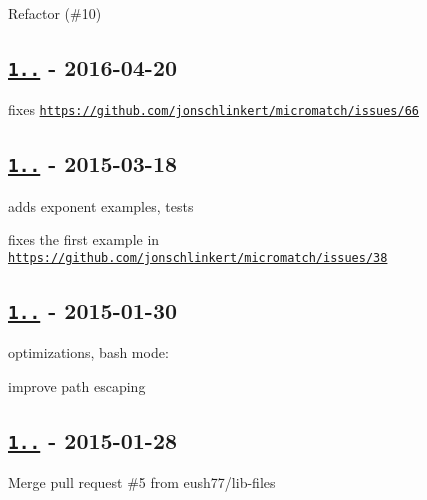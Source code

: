 \begin{DoxyItemize}
\item Refactor (\#10)
\end{DoxyItemize}

\subsection*{\href{https://github.com/micromatch/braces/compare/1.8.0...1.8.4}{\tt 1..} -\/ 2016-\/04-\/20}


\begin{DoxyItemize}
\item fixes \href{https://github.com/jonschlinkert/micromatch/issues/66}{\tt https\+://github.\+com/jonschlinkert/micromatch/issues/66}
\end{DoxyItemize}

\subsection*{\href{https://github.com/micromatch/braces/compare/1.6.0...1.8.0}{\tt 1..} -\/ 2015-\/03-\/18}


\begin{DoxyItemize}
\item adds exponent examples, tests
\item fixes the first example in \href{https://github.com/jonschlinkert/micromatch/issues/38}{\tt https\+://github.\+com/jonschlinkert/micromatch/issues/38}
\end{DoxyItemize}

\subsection*{\href{https://github.com/micromatch/braces/compare/1.5.0...1.6.0}{\tt 1..} -\/ 2015-\/01-\/30}


\begin{DoxyItemize}
\item optimizations, {\ttfamily bash} mode\+:
\item improve path escaping
\end{DoxyItemize}

\subsection*{\href{https://github.com/micromatch/braces/compare/1.4.0...1.5.0}{\tt 1..} -\/ 2015-\/01-\/28}


\begin{DoxyItemize}
\item Merge pull request \#5 from eush77/lib-\/files
\end{DoxyItemize}


